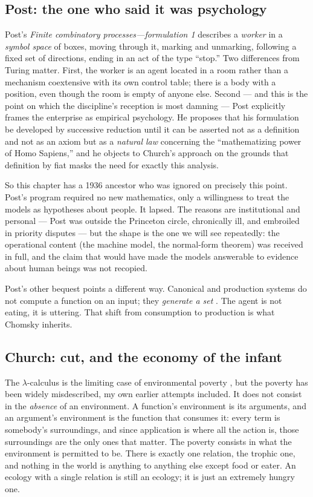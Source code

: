 \subsection{Post: the one who said it was psychology}
\label{psy:sec:post}

Post's \emph{Finite combinatory processes---formulation 1}
\cite{post1936} describes a \emph{worker} in a \emph{symbol space}
of boxes, moving through it, marking and unmarking, following a
fixed set of directions, ending in an act of the type ``stop.''
Two differences from Turing matter.
First, the worker is an agent located in a room rather than a
mechanism coextensive with its own control table; there is a body
with a position, even though the room is empty of anyone else.
Second --- and this is the point on which the discipline's reception
is most damning --- Post explicitly frames the enterprise as
empirical psychology.
He proposes that his formulation be developed by successive
reduction until it can be asserted not as a definition and not as an
axiom but as a \emph{natural law} concerning the ``mathematizing
power of Homo Sapiens,'' and he objects to Church's approach on the
grounds that definition by fiat masks the need for exactly this
analysis.

So this chapter has a 1936 ancestor who was ignored on precisely
this point.
Post's program required no new mathematics, only a willingness to
treat the models as hypotheses about people.
It lapsed.
The reasons are institutional and personal --- Post was outside the
Princeton circle, chronically ill, and embroiled in priority
disputes --- but the shape is the one we will see repeatedly: the
operational content (the machine model, the normal-form theorem) was
received in full, and the claim that would have made the models
answerable to evidence about human beings was not recopied.

Post's other bequest points a different way.
Canonical and production systems do not compute a function on an
input; they \emph{generate a set} \cite{post1943}.
The agent is not eating, it is uttering.
That shift from consumption to production is what Chomsky inherits.

\subsection{Church: cut, and the economy of the infant}
\label{psy:sec:church}

The $\lambda$-calculus is the limiting case of environmental
poverty \cite{church1936}, but the poverty has been widely
misdescribed, my own earlier attempts included.
It does not consist in the \emph{absence} of an environment.
A function's environment is its arguments, and an argument's
environment is the function that consumes it: every term is
somebody's surroundings, and since application is where all the
action is, those surroundings are the only ones that matter.
The poverty consists in what the environment is permitted to be.
There is exactly one relation, the trophic one, and nothing in the
world is anything to anything else except food or eater.
An ecology with a single relation is still an ecology; it is just an
extremely hungry one.

